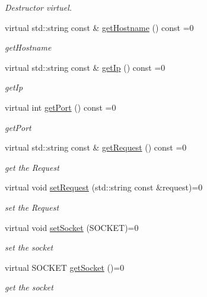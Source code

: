 \begin{DoxyCompactItemize}
\begin{DoxyCompactList}\small\item\em Destructor virtuel. \end{DoxyCompactList}\item 
virtual std\-::string const \& \hyperlink{classapimeal_1_1IConnexion_a8ab3c43f9e1356ed9d46a30ff86ee093}{get\-Hostname} () const =0
\begin{DoxyCompactList}\small\item\em get\-Hostname \end{DoxyCompactList}\item 
virtual std\-::string const \& \hyperlink{classapimeal_1_1IConnexion_a6504bb6018c8ddb8cf367384a0b7b178}{get\-Ip} () const =0
\begin{DoxyCompactList}\small\item\em get\-Ip \end{DoxyCompactList}\item 
virtual int \hyperlink{classapimeal_1_1IConnexion_a405c77b84198d491f20e79a0fcb4d133}{get\-Port} () const =0
\begin{DoxyCompactList}\small\item\em get\-Port \end{DoxyCompactList}\item 
virtual std\-::string const \& \hyperlink{classapimeal_1_1IConnexion_ae1a0352ab450dea6afd278385747f750}{get\-Request} () const =0
\begin{DoxyCompactList}\small\item\em get the Request \end{DoxyCompactList}\item 
virtual void \hyperlink{classapimeal_1_1IConnexion_aba7b8303d379e629b59f49621fd6b704}{set\-Request} (std\-::string const \&request)=0
\begin{DoxyCompactList}\small\item\em set the Request \end{DoxyCompactList}\item 
virtual void \hyperlink{classapimeal_1_1IConnexion_a795ffdde9790a370c59898549265129e}{set\-Socket} (S\-O\-C\-K\-E\-T)=0
\begin{DoxyCompactList}\small\item\em set the socket \end{DoxyCompactList}\item 
virtual S\-O\-C\-K\-E\-T \hyperlink{classapimeal_1_1IConnexion_a219c70ab218a9b3449557238a50e00b8}{get\-Socket} ()=0
\begin{DoxyCompactList}\small\item\em get the socket \end{DoxyCompactList}\end{DoxyCompactItemize}


